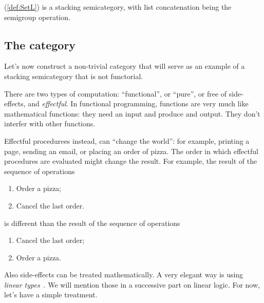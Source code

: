 \begin{example}
    \SetL (\cref{def:SetL}) is a stacking semicategory,
    with list concatenation being the semigroup operation.
\end{example}

\subsection{The \Effects category}

Let's now construct a non-trivial category that will serve as an example of a stacking semicategory that is not functorial.

There are two types of computation: ``functional'', or ``pure'', or free of side-effects, and \emph{effectful}.
In functional programming, functions are very much like mathematical functions: they need an input and produce and output.
They don't interfer with other functions.

Effectful procedurees instead, can ``change the world'': for example, printing a page, sending an email, or placing an order of pizza.
The order in which effectful procedures are evaluated might change the result.
For example, the result of the sequence of operations
%
\begin{enumerate}
    \item Order a pizza;
    \item Cancel the last order.
\end{enumerate}
%
is different than the result of the sequence of operations
%
\begin{enumerate}
    \item Cancel the last order;
    \item Order a pizza.
\end{enumerate}

Also side-effects can be treated mathematically.
A very elegant way is using \emph{linear types}~\cite{Wadler90lineartypes}.
We will mention those in a successive part on linear logic.
For now, let's have a simple treatment.

\begin{marginfigure}
    \centering
    \\
    \caption{}
    \label{fig:effects12}
\end{marginfigure}

